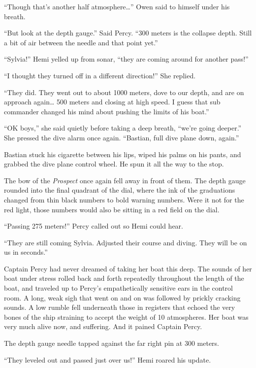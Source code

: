 \documentclass[]{scrbook}
\begin{document}
``Though that's another half atmosphere\ldots{}'' Owen said to himself
under his breath.

``But look at the depth gauge.'' Said Percy. ``300 meters is the
collapse depth. Still a bit of air between the needle and that point
yet.''

``Sylvia!'' Hemi yelled up from sonar, ``they are coming around for
another pass!''

``I thought they turned off in a different direction!'' She replied.

``They did. They went out to about 1000 meters, dove to our depth, and
are on approach again\ldots{} 500 meters and closing at high speed. I
guess that sub commander changed his mind about pushing the limits of
his boat.''

``OK boys,'' she said quietly before taking a deep breath, ``we're going
deeper.'' She pressed the dive alarm once again. ``Bastian, full dive
plane down, again.''

Bastian stuck his cigarette between his lips, wiped his palms on his
pants, and grabbed the dive plane control wheel. He spun it all the way
to the stop.

The bow of the \emph{Prospect} once again fell away in front of them.
The depth gauge rounded into the final quadrant of the dial, where the
ink of the graduations changed from thin black numbers to bold warning
numbers. Were it not for the red light, those numbers would also be
sitting in a red field on the dial.

``Passing 275 meters!'' Percy called out so Hemi could hear.

``They are still coming Sylvia. Adjusted their course and diving. They
will be on us in seconds.''

Captain Percy had never dreamed of taking her boat this deep. The sounds
of her boat under stress rolled back and forth repeatedly throughout the
length of the boat, and traveled up to Percy's empathetically sensitive
ears in the control room. A long, weak sigh that went on and on was
followed by prickly cracking sounds. A low rumble fell underneath those
in registers that echoed the very bones of the ship straining to accept
the weight of 10 atmospheres. Her boat was very much alive now, and
suffering. And it pained Captain Percy.

The depth gauge needle tapped against the far right pin at 300 meters.

``They leveled out and passed just over us!'' Hemi roared his update.
\end{document}
